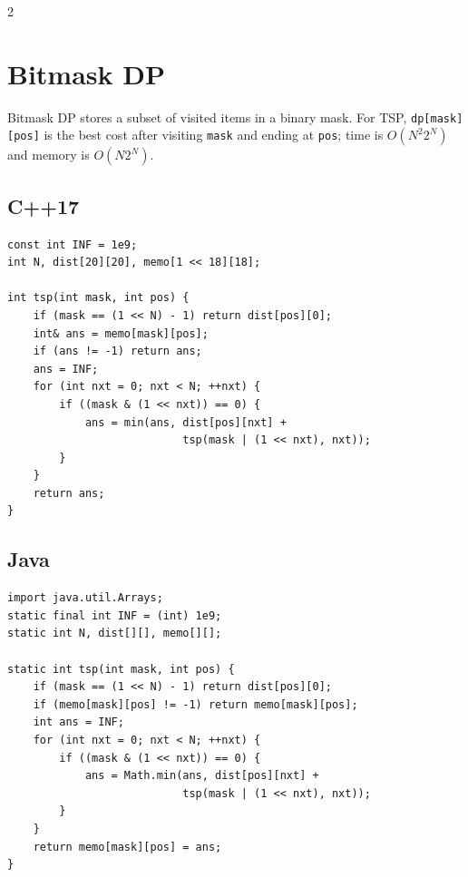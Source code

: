 \documentclass[10pt]{article}
\newcommand{\code}[1]{\texttt{#1}}
\begin{document}
\begin{multicols}{2}
\section{Bitmask DP}
Bitmask DP stores a subset of visited items in a binary mask. For TSP,
\code{dp[mask][pos]} is the best cost after visiting \code{mask} and ending
at \code{pos}; time is $O(N^2 2^N)$ and memory is $O(N2^N)$.

\subsection{C++17}
\begin{framed}
\scriptsize
\begin{verbatim}
const int INF = 1e9;
int N, dist[20][20], memo[1 << 18][18];

int tsp(int mask, int pos) {
    if (mask == (1 << N) - 1) return dist[pos][0];
    int& ans = memo[mask][pos];
    if (ans != -1) return ans;
    ans = INF;
    for (int nxt = 0; nxt < N; ++nxt) {
        if ((mask & (1 << nxt)) == 0) {
            ans = min(ans, dist[pos][nxt] +
                           tsp(mask | (1 << nxt), nxt));
        }
    }
    return ans;
}
\end{verbatim}
\end{framed}

\subsection{Java}
\begin{framed}
\scriptsize
\begin{verbatim}
import java.util.Arrays;
static final int INF = (int) 1e9;
static int N, dist[][], memo[][];

static int tsp(int mask, int pos) {
    if (mask == (1 << N) - 1) return dist[pos][0];
    if (memo[mask][pos] != -1) return memo[mask][pos];
    int ans = INF;
    for (int nxt = 0; nxt < N; ++nxt) {
        if ((mask & (1 << nxt)) == 0) {
            ans = Math.min(ans, dist[pos][nxt] +
                           tsp(mask | (1 << nxt), nxt));
        }
    }
    return memo[mask][pos] = ans;
}
\end{verbatim}
\end{framed}

\end{multicols}
\newpage
\end{document}
